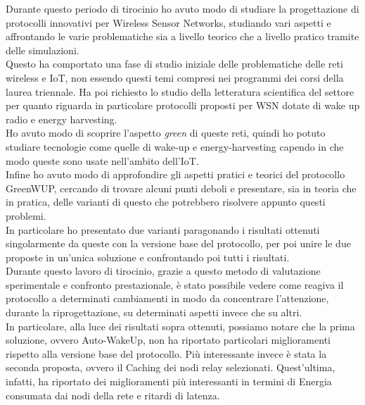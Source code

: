 Durante questo periodo di tirocinio ho avuto modo di studiare la progettazione di protocolli innovativi per Wireless Sensor Networks, studiando vari aspetti e affrontando le varie problematiche sia a livello teorico che a livello pratico tramite delle simulazioni.\\
Questo ha comportato una fase di studio iniziale delle problematiche delle reti wireless e IoT, non essendo questi temi compresi nei programmi dei corsi della laurea triennale. Ha poi richiesto lo studio della letteratura scientifica del settore per quanto riguarda in particolare protocolli proposti per WSN dotate di wake up radio e energy harvesting.\\

Ho avuto modo di scoprire l'aspetto \textit{green} di queste reti, quindi ho potuto studiare tecnologie come quelle di wake-up e energy-harvesting capendo in che modo queste sono usate nell'ambito dell'IoT.\\

Infine ho avuto modo di approfondire gli aspetti pratici e teorici del protocollo GreenWUP, cercando di trovare alcuni punti deboli e presentare, sia in teoria che in pratica, delle varianti di questo che potrebbero risolvere appunto questi problemi.\\
In particolare ho presentato due varianti paragonando i risultati ottenuti singolarmente da queste con la versione base del protocollo, per poi unire le due proposte in un'unica soluzione e confrontando poi tutti i risultati.\\
Durante questo lavoro di tirocinio, grazie a questo metodo di valutazione sperimentale e confronto prestazionale, è stato possibile vedere come reagiva il protocollo a determinati cambiamenti in modo da concentrare l'attenzione, durante la riprogettazione, su determinati aspetti invece che su altri. \\

In particolare, alla luce dei risultati sopra ottenuti, possiamo notare che la prima soluzione, ovvero Auto-WakeUp, non ha riportato particolari miglioramenti rispetto alla versione base del protocollo. Più interessante invece è stata la seconda proposta, ovvero il Caching dei nodi relay selezionati. Quest'ultima, infatti, ha riportato dei miglioramenti più interessanti in termini di Energia consumata dai nodi della rete e ritardi di latenza.\\


